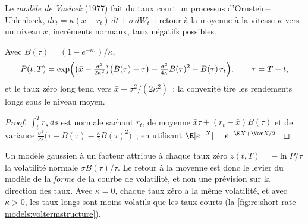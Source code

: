 \begin{definition}\label{def:rc:short-rate-models:vasicek}
Le \emph{modèle de Vasicek} (1977) fait du taux court un
processus d'Ornstein--Uhlenbeck, $dr_t = \kappa(\bar x-r_t)\,dt+\sigma\,dW_t$~: retour
à la moyenne à la vitesse $\kappa$ vers un niveau $\bar x$, incréments normaux, taux négatifs
possibles.
\end{definition}

\begin{proposition}\label{prop:rc:short-rate-models:vasicek}
Avec $B(\tau) = (1-e^{-\kappa\tau})/\kappa$,
\[
P(t,T) = \exp\Bigl(\bigl(\bar x-\tfrac{\sigma^2}{2\kappa^2}\bigr)\bigl(B(\tau)-\tau\bigr)
-\tfrac{\sigma^2}{4\kappa}B(\tau)^2 - B(\tau)\,r_t\Bigr),\qquad \tau = T-t,
\]
et le taux zéro long tend vers $\bar x-\sigma^2/(2\kappa^2)$~: la convexité tire les
rendements longs sous le niveau moyen.
\end{proposition}
\begin{proof}
$\int_t^Tr_s\,ds$ est normale sachant $r_t$, de moyenne $\bar x\tau+(r_t-\bar
x)B(\tau)$ et de variance $\frac{\sigma^2}{\kappa^2}\bigl(\tau-B(\tau)-\frac\kappa2
B(\tau)^2\bigr)$~; en utilisant $\E[e^{-X}] = e^{-\E X+\Var X/2}$.
\end{proof}

Un modèle gaussien à un facteur attribue à chaque taux zéro $z(t,T) = -\ln P/\tau$ la
volatilité normale $\sigma B(\tau)/\tau$. Le retour à la moyenne est donc le levier du modèle
de la \emph{forme} de la courbe de volatilité, et non une prévision sur la direction
des taux. Avec $\kappa=0$, chaque taux zéro a la même volatilité, et avec
$\kappa>0$, les taux longs sont moins volatils que les taux courts
(la \cref{fig:rc:short-rate-models:voltermstructure}).

